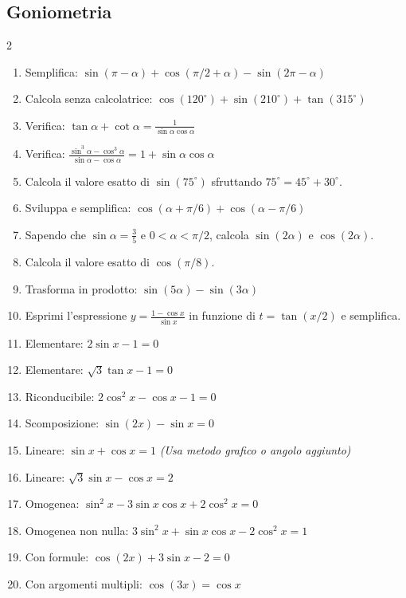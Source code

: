 \subsection{Goniometria}
\begin{multicols}{2}
\begin{enumerate}
    \item {} Semplifica: $\sin(\pi - \alpha) + \cos(\pi/2 + \alpha) - \sin(2\pi - \alpha)$
    \item {} Calcola senza calcolatrice: $\cos(120^\circ) + \sin(210^\circ) + \tan(315^\circ)$
    \item {} Verifica: $\tan \alpha + \cot \alpha = \frac{1}{\sin \alpha \cos \alpha}$
    \item {} Verifica: $\frac{\sin^3 \alpha - \cos^3 \alpha}{\sin \alpha - \cos \alpha} = 1 + \sin \alpha \cos \alpha$
    \item {} Calcola il valore esatto di $\sin(75^\circ)$ sfruttando $75^\circ = 45^\circ + 30^\circ$.
    \item {} Sviluppa e semplifica: $\cos(\alpha + \pi/6) + \cos(\alpha - \pi/6)$
    \item {} Sapendo che $\sin \alpha = \frac{3}{5}$ e $0 < \alpha < \pi/2$, calcola $\sin(2\alpha)$ e $\cos(2\alpha)$.
    \item {} Calcola il valore esatto di $\cos(\pi/8)$.
    \item {} Trasforma in prodotto: $\sin(5\alpha) - \sin(3\alpha)$
    \item {} Esprimi l'espressione $y = \frac{1 - \cos x}{\sin x}$ in funzione di $t = \tan(x/2)$ e semplifica.
    
    \item {} Elementare: $2\sin x - 1 = 0$
    \item {} Elementare: $\sqrt{3}\tan x - 1 = 0$
    \item {} Riconducibile: $2\cos^2 x - \cos x - 1 = 0$
    \item {} Scomposizione: $\sin(2x) - \sin x = 0$
    \item {} Lineare: $\sin x + \cos x = 1$ \textit{(Usa metodo grafico o angolo aggiunto)}
    \item {} Lineare: $\sqrt{3}\sin x - \cos x = 2$
    \item {} Omogenea: $\sin^2 x - 3\sin x \cos x + 2\cos^2 x = 0$
    \item {} Omogenea non nulla: $3\sin^2 x + \sin x \cos x - 2\cos^2 x = 1$
    \item {} Con formule: $\cos(2x) + 3\sin x - 2 = 0$
    \item {} Con argomenti multipli: $\cos(3x) = \cos x$
    

\end{enumerate}
\end{multicols}
